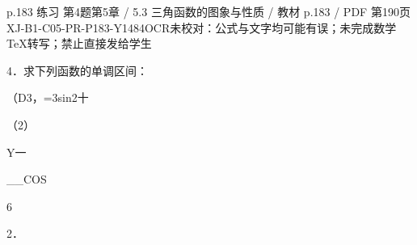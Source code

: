 \begin{bankitem}{p.183 练习 第4题}{第5章 / 5.3 三角函数的图象与性质 / 教材 p.183 / PDF 第190页}{XJ-B1-C05-PR-P183-Y1484}{OCR未校对：公式与文字均可能有误；未完成数学TeX转写；禁止直接发给学生}
\begin{ocrdraft}
\par
4．求下列函数的单调区间：
\par
（D3，=3sin2十
\par
（2）
\par
Y一
\par
\_\_COS
\par
6
\par
2．
\end{ocrdraft}
\end{bankitem}
